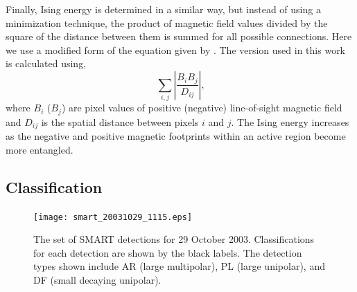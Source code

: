 Finally, Ising energy is determined in a similar way, but instead of using a minimization technique, the product of magnetic field values divided by the square of the distance between them is summed for all possible connections. Here we use a modified form of the equation given by \citet{Ahmed:2010}. The version used in this work is calculated using,
\begin{equation}
\displaystyle\sum\limits_{i,j} \left|\frac{B_i B_j}{D_{ij}}\right| \mbox{,} 
\end{equation}
where $B_i$ ($B_j$) are pixel values of positive (negative) line-of-sight magnetic field and $D_{ij}$ is the spatial distance between pixels $i$ and $j$. The Ising energy increases as the negative and positive magnetic footprints within an active region become more entangled. 


\subsection{Classification}\label{classify}

\begin{figure}[!t]
\centerline{\texttt{[image: smart\_20031029\_1115.eps]}}
\caption[An example set of classified SMART detections.]{The set of SMART detections for 29 October 2003. Classifications for each detection are shown by the black labels. The detection types shown include AR (large multipolar), PL (large unipolar), and DF (small decaying unipolar).}
\label{smartexampledetections}
\end{figure}

